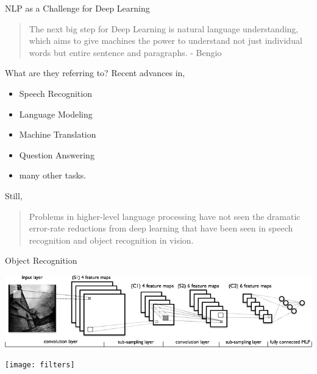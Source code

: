 \documentclass{beamer}
\begin{document}
\begin{frame}{NLP as a Challenge for Deep Learning}

  \begin{quote}
  The next big step for Deep Learning is natural language
  understanding, which aims to give machines the power to understand
  not just individual words but entire sentence and paragraphs. {\normalfont - Bengio }
  \end{quote}
\end{frame}

\begin{frame}{What are they referring to?}
  Recent advances in,
  \begin{itemize}
  \item Speech Recognition 
  \item Language Modeling 
  \item Machine Translation
  \item Question Answering
  \item many other tasks.
  \end{itemize}

  \pause 
  Still,
  \begin{quote}
    Problems in higher-level language processing have not seen the dramatic error-rate reductions from deep learning 
    that have been seen in speech recognition and object recognition in vision.
  \end{quote}

\end{frame}


\begin{frame}{Object Recognition}
  \begin{center}
    \includegraphics[width=\textwidth]{mylenet}
  \end{center}
\end{frame}

\begin{frame}
  \vspace{-0.25cm}

  \begin{center}
    \texttt{[image: filters]}
  \end{center}
\end{frame}
\end{document}
